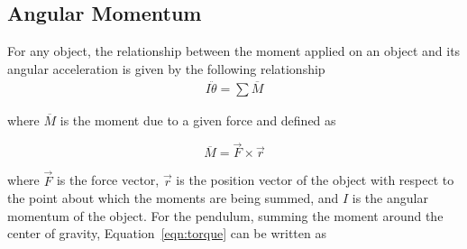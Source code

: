 \documentclass{notes}
\begin{document}
 

 \subsection{Angular Momentum}
 
 For any object, the relationship between the moment applied on an object and its angular acceleration is given by the following relationship
 \begin{align}
   I \ddot{\theta} = \sum \overline{M} \label{eqn:torque}
 \end{align}
 
 where $\overline{M}$ is the moment due to a given force and defined as 
 
 \[
 \overline{M} = \vec{F} \times \vec{r}
 \]
 
 where $\vec{F}$ is the force vector, $\vec{r}$ is the position vector of the object with respect to
 the point about which the moments are being summed, and $I$ is the angular momentum of the object.
 For the pendulum, summing the moment around the center of gravity, Equation~\ref{eqn:torque} can be
 written as
\end{document}
